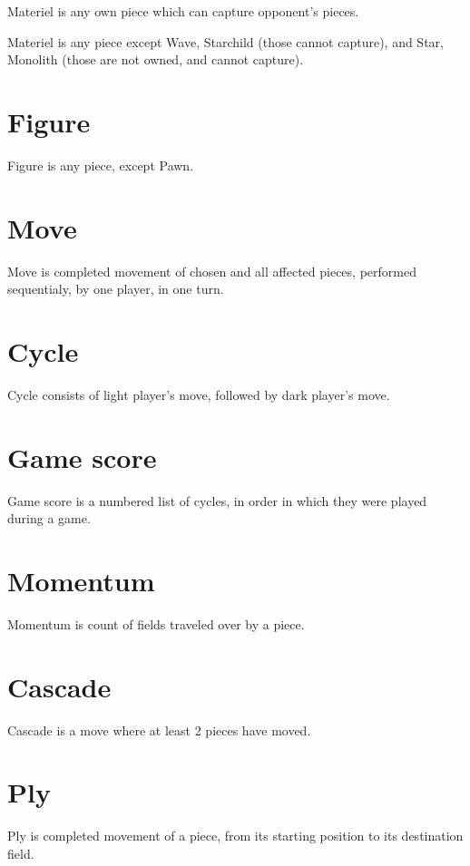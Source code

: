 Materiel is any own piece which can capture opponent's pieces.

Materiel is any piece except Wave, Starchild (those cannot capture),
and Star, Monolith (those are not owned, and cannot capture).

\section*{Figure}
\label{sec:Terms/Figure}
Figure is any piece, except Pawn.

\section*{Move}
\label{sec:Terms/Move}
Move is completed movement of chosen and all affected pieces, performed
sequentialy, by one player, in one turn.

\section*{Cycle}
\label{sec:Terms/Cycle}
Cycle consists of light player's move, followed by dark player's move.

\section*{Game score}
\label{sec:Terms/Game score}
Game score is a numbered list of cycles, in order in which they were played
during a game.

\section*{Momentum}
\label{sec:Terms/Momentum}
Momentum is count of fields traveled over by a piece.

\section*{Cascade}
\label{sec:Terms/Cascade}
Cascade is a move where at least 2 pieces have moved.

\section*{Ply}
\label{sec:Terms/Ply}
Ply is completed movement of a piece, from its starting position to its destination
field.

